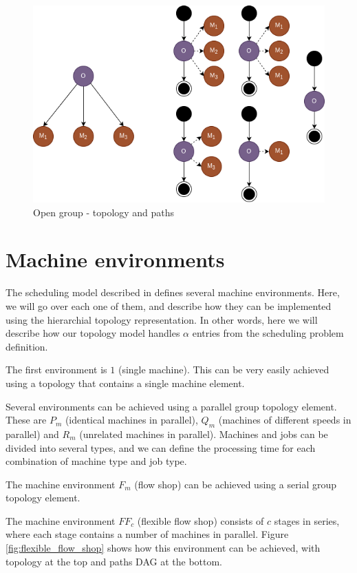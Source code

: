 \begin{figure}[!htbp]
	\centering
	\includegraphics[scale=0.6]{../images/open_group.png}
	\caption{Open group - topology and paths}
    \label{fig:open_group}
\end{figure}

\section{Machine environments}
\label{sec:machine_environments}
The scheduling model described in \citep{pinedo2016scheduling} defines several machine environments. Here, we will go over each one of them, and describe how they can be implemented using the hierarchial topology representation. In other words, here we will describe how our topology model handles $\alpha$ entries from the scheduling problem definition.

The first environment is $1$ (single machine). This can be very easily achieved using a topology that contains a single machine element.

Several environments can be achieved using a parallel group topology element. These are $P_m$ (identical machines in parallel), $Q_m$ (machines of different speeds in parallel) and $R_m$ (unrelated machines in parallel). Machines and jobs can be divided into several types, and we can define the processing time for each combination of machine type and job type.

The machine environment $F_m$ (flow shop) can be achieved using a serial group topology element.

The machine environment $FF_c$ (flexible flow shop) consists of $c$ stages in series, where each stage contains a number of machines in parallel. Figure \ref{fig:flexible_flow_shop} shows how this environment can be achieved, with topology at the top and paths DAG at the bottom.

